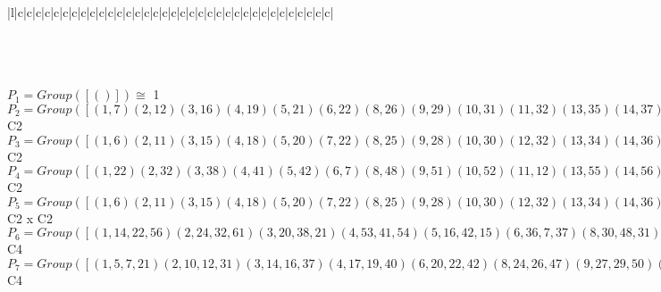 \documentclass[varwidth=\maxdimen,border=10]{standalone}
\begin{document}
\begin{tabular}
\begin{array}{|l|c|c|c|c|c|c|c|c|c|c|c|c|c|c|c|c|c|c|c|c|c|c|c|c|c|c|c|c|c|c|c|c|c|c|c|}
\end{array}\)\\
\ \\
\ \\
$P_{1} = Group( [ () ] )\cong$ 1\ \\
$P_{2} = Group( [ ( 1, 7)( 2,12)( 3,16)( 4,19)( 5,21)( 6,22)( 8,26)( 9,29)(10,31)(11,32)(13,35)(14,37)(15,38)(17,40)(18,41)(20,42)(23,45)(24,47)(25,48)(27,50)(28,51)(30,52)(33,54)(34,55)(36,56)(39,57)(43,59)(44,60)(46,61)(49,62)(53,63)(58,64) ] )\cong$ C2\ \\
$P_{3} = Group( [ ( 1, 6)( 2,11)( 3,15)( 4,18)( 5,20)( 7,22)( 8,25)( 9,28)(10,30)(12,32)(13,34)(14,36)(16,38)(17,39)(19,41)(21,42)(23,44)(24,46)(26,48)(27,49)(29,51)(31,52)(33,53)(35,55)(37,56)(40,57)(43,58)(45,60)(47,61)(50,62)(54,63)(59,64) ] )\cong$ C2\ \\
$P_{4} = Group( [ ( 1,22)( 2,32)( 3,38)( 4,41)( 5,42)( 6, 7)( 8,48)( 9,51)(10,52)(11,12)(13,55)(14,56)(15,16)(17,57)(18,19)(20,21)(23,60)(24,61)(25,26)(27,62)(28,29)(30,31)(33,63)(34,35)(36,37)(39,40)(43,64)(44,45)(46,47)(49,50)(53,54)(58,59) ] )\cong$ C2\ \\
$P_{5} = Group( [ ( 1, 6)( 2,11)( 3,15)( 4,18)( 5,20)( 7,22)( 8,25)( 9,28)(10,30)(12,32)(13,34)(14,36)(16,38)(17,39)(19,41)(21,42)(23,44)(24,46)(26,48)(27,49)(29,51)(31,52)(33,53)(35,55)(37,56)(40,57)(43,58)(45,60)(47,61)(50,62)(54,63)(59,64), ( 1, 7)( 2,12)( 3,16)( 4,19)( 5,21)( 6,22)( 8,26)( 9,29)(10,31)(11,32)(13,35)(14,37)(15,38)(17,40)(18,41)(20,42)(23,45)(24,47)(25,48)(27,50)(28,51)(30,52)(33,54)(34,55)(36,56)(39,57)(43,59)(44,60)(46,61)(49,62)(53,63)(58,64) ] )\cong$ C2 x C2\ \\
$P_{6} = Group( [ ( 1,14,22,56)( 2,24,32,61)( 3,20,38,21)( 4,53,41,54)( 5,16,42,15)( 6,36, 7,37)( 8,30,48,31)( 9,58,51,59)(10,26,52,25)(11,46,12,47)(13,17,55,57)(18,33,19,63)(23,27,60,62)(28,43,29,64)(34,39,35,40)(44,49,45,50), ( 1,22)( 2,32)( 3,38)( 4,41)( 5,42)( 6, 7)( 8,48)( 9,51)(10,52)(11,12)(13,55)(14,56)(15,16)(17,57)(18,19)(20,21)(23,60)(24,61)(25,26)(27,62)(28,29)(30,31)(33,63)(34,35)(36,37)(39,40)(43,64)(44,45)(46,47)(49,50)(53,54)(58,59) ] )\cong$ C4\ \\
$P_{7} = Group( [ ( 1, 5, 7,21)( 2,10,12,31)( 3,14,16,37)( 4,17,19,40)( 6,20,22,42)( 8,24,26,47)( 9,27,29,50)(11,30,32,52)(13,33,35,54)(15,36,38,56)(18,39,41,57)(23,43,45,59)(25,46,48,61)(28,49,51,62)(34,53,55,63)(44,58,60,64), ( 1, 7)( 2,12)( 3,16)( 4,19)( 5,21)( 6,22)( 8,26)( 9,29)(10,31)(11,32)(13,35)(14,37)(15,38)(17,40)(18,41)(20,42)(23,45)(24,47)(25,48)(27,50)(28,51)(30,52)(33,54)(34,55)(36,56)(39,57)(43,59)(44,60)(46,61)(49,62)(53,63)(58,64) ] )\cong$ C4\ \\

\end{tabular}
\end{document}

